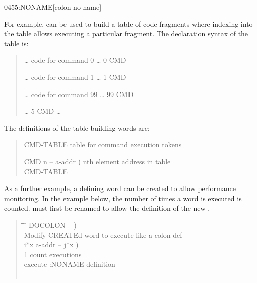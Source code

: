 \begin{newword}{0455}{:NONAME}[colon-no-name]
\begin{rationale}
		For example,  can be used to build a table of
		code fragments where indexing into the table allows executing
		a particular fragment. The declaration syntax of the table is:

		\begin{quote}\ttfamily
			 {\ldots} code for command 0 {\ldots} \word{;}
			0 CMD \word{!}

			 {\ldots} code for command 1 {\ldots} \word{;}
			1 CMD \word{!}

			\tab {\ldots}

			 {\ldots} code for command 99 {\ldots} \word{;}
			99 CMD \word{!}

			{\ldots} 5 CMD   {\ldots}
		\end{quote}

		The definitions of the table building words are:

		\begin{quote}\ttfamily
			 CMD-TABLE
				 table for command execution tokens \\
			  

			\word{:} CMD  n -- a-addr )
				 nth element address in table \\
			\tab {} CMD-TABLE \word{+}
			\word{;}
		\end{quote}

		As a further example, a defining word can be created to allow
		performance monitoring. In the example below, the number of
		times a word is executed is counted. \word{:} must first be
		renamed to allow the definition of the new \word{;}.

		\begin{quote}\ttfamily
		  \begin{tabbing}
			\tab \= \tab \= \hspace*{12em} \= \kill
			\word{:} DOCOLON  -- ) \\
			\+  Modify CREATEd word to execute like a colon def \\
				\+   i*x a-addr -- j*x ) \\
					1  \word{+!}								\>  count executions \\
			\-	\-	  				\>  execute :NONAME definition \\
			\word{;} \\[1.5\parskip]


\end{tabbing}
\end{quote}
\end{rationale}
\end{newword}

